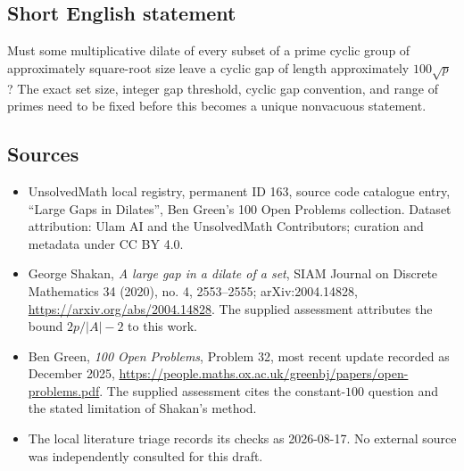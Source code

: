 \documentclass[11pt]{article}
\begin{document}
\subsection{Short English statement}
Must some multiplicative dilate of every subset of a prime cyclic group of approximately square-root size leave a cyclic gap of length approximately $100\sqrt p$? The exact set size, integer gap threshold, cyclic gap convention, and range of primes need to be fixed before this becomes a unique nonvacuous statement.
\subsection{Sources}
\begin{itemize}
\item UnsolvedMath local registry, permanent ID 163, source code catalogue entry, ``Large Gaps in Dilates'', Ben Green's 100 Open Problems collection. Dataset attribution: Ulam AI and the UnsolvedMath Contributors; curation and metadata under CC BY 4.0.
\item George Shakan, \emph{A large gap in a dilate of a set}, SIAM Journal on Discrete Mathematics 34 (2020), no. 4, 2553--2555; arXiv:2004.14828, \url{https://arxiv.org/abs/2004.14828}. The supplied assessment attributes the bound $2p/|A|-2$ to this work.
\item Ben Green, \emph{100 Open Problems}, Problem 32, most recent update recorded as December 2025, \url{https://people.maths.ox.ac.uk/greenbj/papers/open-problems.pdf}. The supplied assessment cites the constant-$100$ question and the stated limitation of Shakan's method.
\item The local literature triage records its checks as 2026-08-17. No external source was independently consulted for this draft.
\end{itemize}
\end{document}
